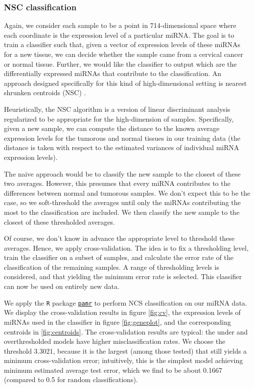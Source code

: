 \documentclass[12pt,english]{article}\usepackage{graphicx, color}
\numberwithin{equation}{section}
\numberwithin{figure}{section}
\theoremstyle{plain}
\theoremstyle{remark}
\begin{document}
\subsubsection{NSC classification}

Again, we consider each sample to be a point in
714-dimensional space where each coordinate is the
expression level of a particular miRNA. The goal is to train a
classifier such that, given a vector of expression levels of these
miRNAs for a new tissue, we can decide whether the sample came from a
cervical cancer or normal tissue. Further, we would like the
classifier to output which are the differentially expressed miRNAs
that contribute to the classification. An approach designed
specifically for this kind of high-dimensional setting is nearest
shrunken centroids (NSC) \cite{tibshirani2003class,
  hastie2005elements}.

Heuristically, the NSC algorithm is a version of linear
discriminant analysis regularized to be appropriate for the
high-dimension of samples. Specifically, given a new sample, we can
compute the distance to the known average expression levels for the
tumorous and normal tissues in our training data (the distance is
taken with respect to the estimated variances of individual miRNA
expression levels).

The naive approach would be to classify the new sample to the closest
of these two averages. However, this presumes that every miRNA
contributes to the differences between normal and tumorous samples.
We don't expect this to be the case, so we soft-threshold the
averages until only the miRNAs contributing the most to the
classification are included. We then classify the new sample to the
closest of these thresholded averages.

Of course, we don't know in advance the appropriate level to threshold
these averages. Hence, we apply cross-validation. The idea is to fix a
thresholding level, train the classifier on a subset of samples, and
calculate the error rate of the classification of the remaining
samples. A range of thresholding levels is considered, and that
yielding the minimum error rate is selected. This classifier can now
be used on entirely new data.

We apply the \texttt{R} package
\href{http://cran.r-project.org/web/packages/pamr/index.html}{\texttt{pamr}}
to perform NCS classification on our miRNA data. We display the
cross-validation results in figure \ref{fig:cv}, the expression levels
of miRNAs used in the classifier in figure \ref{fig:geneplot}, and the
corresponding centroids in \ref{fig:centroids}. The cross-validation
results are typical: the under and overthresholded models have higher
misclassification rates. We choose the threshold 3.3021,
because it is the largest (among those tested) that still yields a
minimum cross-validation error; intuitively, this is the simplest
model achieving minimum estimated average test error, which we find to
be about 0.1667 (compared to 0.5 for random
classifications).
\end{document}
